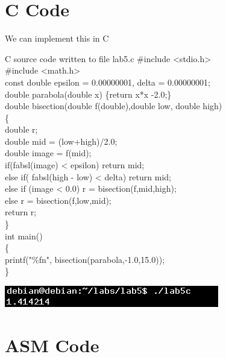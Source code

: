 \documentclass{article}
\begin{document}
\section{C Code}
We can implement this in C
\begin{GFT}{C source code written to file lab5.c}
\+\#include <stdio.h>\\
\+\#include <math.h>\\
\+const double epsilon = 0.00000001, delta = 0.00000001;\\
\+double parabola(double x) \{return x*x -2.0;\}\\
\+double bisection(double f(double),double low, double high)\\
\+\{\\
\+	double r;\\
\+	double mid = (low+high)/2.0;\\
\+	double image = f(mid);\\
\+	if(fabsl(image) < epsilon) return mid;\\
\+	else if( fabsl(high - low) < delta) return mid;\\
\+	else if (image < 0.0) r = bisection(f,mid,high);\\
\+	else r = bisection(f,low,mid);\\
\+	return r;\\
\+\}\\
\+int main()\\
\+\{\\
\+	printf("\%f\Backslash{}n", bisection(parabola,-1.0,15.0));\\
\+\}\\
\end{GFT}
\includegraphics[scale = 0.8]{lab5c.png}
\section{ASM Code}
\end{document}
